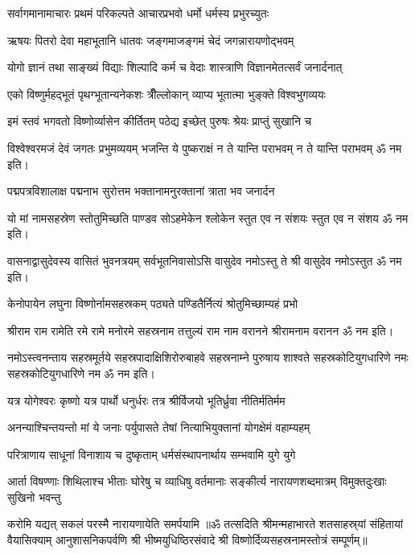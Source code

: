 \twolineshloka
{सर्वागमानामाचारः प्रथमं परिकल्पते}
{आचारप्रभवो धर्मो धर्मस्य प्रभुरच्युतः}

\twolineshloka
{ऋषयः पितरो देवा महाभूतानि धातवः}
{जङ्गमाजङ्गमं चेदं जगन्नारायणोद्भवम्}

\twolineshloka
{योगो ज्ञानं तथा साङ्ख्यं विद्याः शिल्पादि कर्म च}
{वेदाः शास्त्राणि विज्ञानमेतत्सर्वं जनार्दनात्}

\twolineshloka
{एको विष्णुर्महद्भूतं पृथग्भूतान्यनेकशः}
{त्रीँल्लोकान् व्याप्य भूतात्मा भुङ्क्ते विश्वभुगव्ययः}

\twolineshloka
{इमं स्तवं भगवतो विष्णोर्व्यासेन कीर्तितम्}
{पठेद्य इच्छेत् पुरुषः श्रेयः प्राप्तुं सुखानि च}

\twolineshloka
{विश्वेश्वरमजं देवं जगतः प्रभुमव्ययम्}
{भजन्ति ये पुष्कराक्षं न ते यान्ति पराभवम्}
न ते यान्ति पराभवम् ॐ नम इति।

\twolineshloka
{पद्मपत्रविशालाक्ष पद्मनाभ सुरोत्तम}
{भक्तानामनुरक्तानां त्राता भव जनार्दन}

\twolineshloka
{यो मां नामसहस्रेण स्तोतुमिच्छति पाण्डव}
{सोऽहमेकेन श्लोकेन स्तुत एव न संशयः}
स्तुत एव न संशय ॐ नम इति।

\twolineshloka
{वासनाद्वासुदेवस्य वासितं भुवनत्रयम्}
{सर्वभूतनिवासोऽसि वासुदेव नमोऽस्तु ते}
श्री वासुदेव नमोऽस्तुत ॐ नम इति।

\twolineshloka
{केनोपायेन लघुना विष्णोर्नामसहस्रकम्}
{पठ्यते पण्डितैर्नित्यं श्रोतुमिच्छाम्यहं प्रभो}

\twolineshloka
{श्रीराम राम रामेति रमे रामे मनोरमे}
{सहस्रनाम तत्तुल्यं राम नाम वरानने}%
श्रीरामनाम वरानन ॐ नम इति।

\twolineshloka
{नमोऽस्त्वनन्ताय सहस्रमूर्तये सहस्रपादाक्षिशिरोरुबाहवे}
{सहस्रनाम्ने पुरुषाय शाश्वते सहस्रकोटियुगधारिणे नमः}
सहस्रकोटियुगधारिणे नम ॐ नम इति।

\twolineshloka
{यत्र योगेश्वरः कृष्णो यत्र पार्थो धनुर्धरः}
{तत्र श्रीर्विजयो भूतिर्ध्रुवा नीतिर्मतिर्मम}

\twolineshloka
{अनन्याश्चिन्तयन्तो मां ये जनाः पर्युपासते}
{तेषां नित्याभियुक्तानां योगक्षेमं वहाम्यहम्}

\twolineshloka
{परित्राणाय साधूनां विनाशाय च दुष्कृताम्}
{धर्मसंस्थापनार्थाय सम्भवामि युगे युगे}

\fourlineindentedshloka
{आर्ता विषण्णाः शिथिलाश्च भीताः}
{घोरेषु च व्याधिषु वर्तमानाः}
{सङ्कीर्त्य नारायणशब्दमात्रम्}
{विमुक्तदुःखाः सुखिनो भवन्तु}

{करोमि यद्यत् सकलं परस्मै नारायणायेति समर्पयामि}
॥ॐ तत्सदिति श्रीमन्महाभारते शतसाहस्र्यां संहितायां वैयासिक्याम् आनुशासनिकपर्वणि श्री भीष्मयुधिष्ठिरसंवादे श्री विष्णोर्दिव्यसहस्रनामस्तोत्रं सम्पूर्णम्॥
\setlength{\shlokaspaceskip}{24pt}
